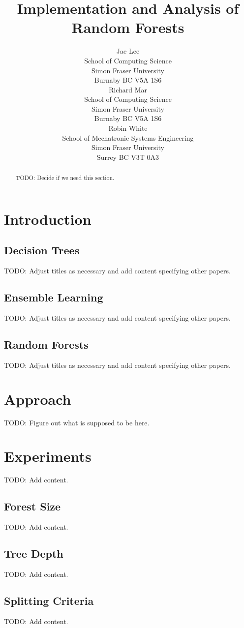\documentclass{article} %
\title{Implementation and Analysis of Random Forests}
\author{
Jae Lee\\
School of Computing Science\\
Simon Fraser University\\
Burnaby BC V5A 1S6 \\
\And
Richard Mar \\
School of Computing Science\\
Simon Fraser University\\
Burnaby BC V5A 1S6 \\
\AND
Robin White \\
School of Mechatronic Systems Engineering\\
Simon Fraser University\\
Surrey BC V3T 0A3 \\
}
\begin{document}
\maketitle

\begin{abstract}
TODO: Decide if we need this section.
\end{abstract}

\section{Introduction}

\subsection{Decision Trees}
TODO: Adjust titles as necessary and add content specifying other papers.

\subsection{Ensemble Learning}
TODO: Adjust titles as necessary and add content specifying other papers.

\subsection{Random Forests}
TODO: Adjust titles as necessary and add content specifying other papers.


\section{Approach}
TODO: Figure out what is supposed to be here.

\section{Experiments}
TODO: Add content.

\subsection{Forest Size}
TODO: Add content.

\subsection{Tree Depth}
TODO: Add content.

\subsection{Splitting Criteria}
TODO: Add content.
\end{document}
